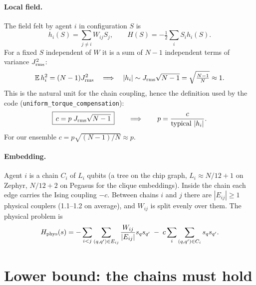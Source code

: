 \documentclass[11pt,a4paper]{article}
\newcommand{\code}[1]{\nolinkurl{#1}}
\begin{document}
\paragraph{Local field.} The field felt by agent $i$ in configuration $S$ is
\begin{equation}
h_i(S)=\sum_{j\neq i}W_{ij}S_j ,\qquad H(S)=-\tfrac12\sum_i S_ih_i(S).
\end{equation}
For a fixed $S$ independent of $W$ it is a sum of $N-1$ independent terms of variance $J_{\rm rms}^2$:
\begin{equation}
\mathbb E\,h_i^2=(N-1)J_{\rm rms}^2\quad\Longrightarrow\quad |h_i|\sim J_{\rm rms}\sqrt{N-1}=\sqrt{\tfrac{N-1}{N}}\approx1 .
\end{equation}
This is the natural unit for the chain coupling, hence the definition used by the code (\code{uniform_torque_compensation}):
\begin{equation}
\boxed{\,c=p\;J_{\rm rms}\sqrt{N-1}\,}\qquad\Longrightarrow\qquad p=\frac{c}{\text{typical }|h_i|}.
\end{equation}
For our ensemble $c=p\sqrt{(N-1)/N}\approx p$.

\paragraph{Embedding.} Agent $i$ is a chain $C_i$ of $L_i$ qubits (a tree on the chip graph, $L_i\approx N/12+1$ on Zephyr, $N/12+2$ on Pegasus for the clique embeddings). Inside the chain each edge carries the Ising coupling $-c$. Between chains $i$ and $j$ there are $|E_{ij}|\ge1$ physical couplers (1.1--1.2 on average), and $W_{ij}$ is split evenly over them. The physical problem is
\begin{equation}
H_{\rm phys}(s)=-\sum_{i<j}\sum_{(q,q')\in E_{ij}}\frac{W_{ij}}{|E_{ij}|}s_qs_{q'}\;-\;c\sum_i\sum_{(q,q')\in C_i}s_qs_{q'} .
\end{equation}

\section{Lower bound: the chains must hold}
\end{document}
